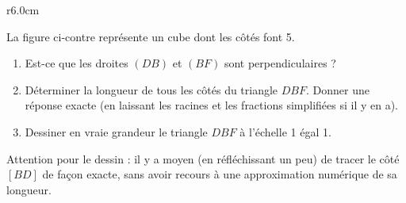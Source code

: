 
\begin{exercice}\label{exoSeconde-0094}

\begin{wrapfigure}{r}{6.0cm}
   \vspace{-0.5cm}        %
   \centering
   
\end{wrapfigure}

        La figure ci-contre représente un cube dont les côtés font \unit{5}{\meter}. 
        \begin{enumerate}
            \item
        Est-ce que les droites \( (DB)\) et \( (BF)\) sont perpendiculaires ?
    \item
        Déterminer la longueur de tous les côtés du triangle \( DBF\). Donner une réponse exacte (en laissant les racines et les fractions simplifiées si il y en a).
    \item
        Dessiner en vraie grandeur le triangle \( DBF\) à l'échelle \unit{1}{\centi\meter} égal \unit{1}{\meter}.
        \end{enumerate}

        Attention pour le dessin : il y a moyen (en réfléchissant un peu) de tracer le côté \( [BD]\) de façon exacte, sans avoir recours à une approximation numérique de sa longueur.
        
\end{exercice}
